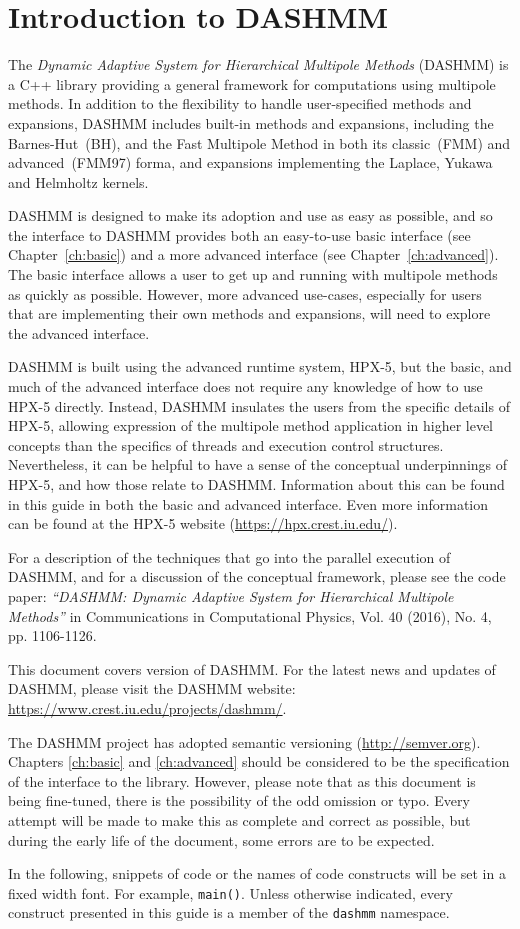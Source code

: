 \chapter{Introduction to DASHMM}
\label{ch:intro}

The {\it Dynamic Adaptive System for Hierarchical Multipole Methods}
(DASHMM) is a C++ library providing a general framework for
computations using multipole methods. In addition to the flexibility
to handle user-specified methods and expansions, DASHMM includes
built-in methods and expansions, including the Barnes-Hut~(BH), and
the Fast Multipole Method in both its classic~(FMM) and advanced~(FMM97)
forma, and expansions implementing the Laplace, Yukawa and Helmholtz kernels.

DASHMM is designed to make its adoption and use as easy as possible,
and so the interface to DASHMM provides both an easy-to-use basic
interface (see Chapter~\ref{ch:basic}) and a more advanced interface
(see Chapter~\ref{ch:advanced}). The basic interface allows a
user to get up and running with multipole methods as quickly as
possible. However, more advanced use-cases, especially for users that
are implementing their own methods and expansions, will need to
explore the advanced interface.

DASHMM is built using the advanced runtime system, HPX-5, but the
basic, and much of the advanced interface does not require any
knowledge of how to use HPX-5 directly. Instead, DASHMM insulates the
users from the specific details of HPX-5, allowing expression of the
multipole method application in higher level concepts than the
specifics of threads and execution control structures. Nevertheless,
it can be helpful to have a sense of the conceptual underpinnings of
HPX-5, and how those relate to DASHMM. Information about this can be
found in this guide in both the basic and advanced interface. Even
more information can be found at the HPX-5 website
(\url{https://hpx.crest.iu.edu/}).

For a description of the techniques that go into the parallel
execution of DASHMM, and for a discussion of the conceptual framework,
please see the code paper: {\it ``DASHMM: Dynamic Adaptive System for
  Hierarchical Multipole Methods''} in Communications in Computational
Physics, Vol. 40 (2016), No. 4, pp. 1106-1126.

This document covers version \version of DASHMM. For the latest news and
updates of DASHMM, please visit the DASHMM website:
\url{https://www.crest.iu.edu/projects/dashmm/}.

The DASHMM project has adopted semantic versioning (\url{http://semver.org}).
Chapters \ref{ch:basic} and \ref{ch:advanced} should be considered to be the
specification of the interface to the library. However, please note that as
this document is being fine-tuned, there is the possibility of the odd
omission or typo. Every attempt will be made to make this as complete and
correct as possible, but during the early life of the document, some errors
are to be expected.

In the following, snippets of code or the names of code constructs
will be set in a fixed width font. For example, {\tt main()}. Unless
otherwise indicated, every construct presented in this guide is a
member of the {\tt dashmm} namespace.